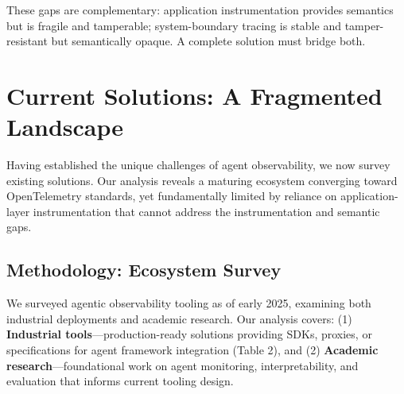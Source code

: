 \documentclass[sigplan,screen,9pt]{acmart}
\begin{document}
These gaps are complementary: application instrumentation provides semantics but is fragile and tamperable; system-boundary tracing is stable and tamper-resistant but semantically opaque. A complete solution must bridge both.

\section{Current Solutions: A Fragmented Landscape}

Having established the unique challenges of agent observability, we now survey existing solutions. Our analysis reveals a maturing ecosystem converging toward OpenTelemetry standards, yet fundamentally limited by reliance on application-layer instrumentation that cannot address the instrumentation and semantic gaps.

\subsection{Methodology: Ecosystem Survey}

We surveyed agentic observability tooling as of early 2025, examining both industrial deployments and academic research. Our analysis covers: (1) \textbf{Industrial tools}—production-ready solutions providing SDKs, proxies, or specifications for agent framework integration (Table 2), and (2) \textbf{Academic research}—foundational work on agent monitoring, interpretability, and evaluation that informs current tooling design.
\end{document}
